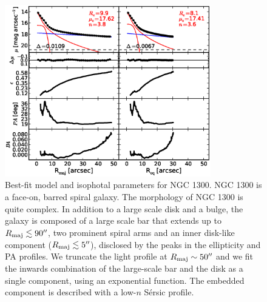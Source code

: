 \documentclass[preprint2]{emulateapj}
\newcommand{\fitfigurewidth}{0.8\textwidth}
\begin{document}
  \begin{figure}[h]
  \begin{center}
  \includegraphics[width=\fitfigurewidth]{images/n1300_1Dfit.eps}
  \caption{Best-fit model and isophotal parameters for NGC 1300.
  NGC 1300 is a face-on, barred spiral galaxy. 
  The morphology of NGC 1300 is quite complex. 
  In addition to a large scale disk and a bulge, the galaxy is composed of 
  a large scale bar that extends up to $R_{\rm maj} \lesssim 90''$, two prominent spiral arms 
  and an inner disk-like component ($R_{\rm maj} \lesssim 5''$), disclosed by the peaks in the ellipticity and PA profiles.
  We truncate the light profile at $R_{\rm maj} \sim 50''$ and we fit the inwards combination of the large-scale bar and the disk 
  as a single component, using an exponential function.
  The embedded component is described with a low-$n$ S\'ersic profile. 
  }
  \end{center}
  \end{figure}
\end{document}
